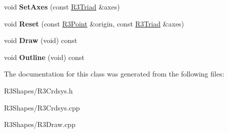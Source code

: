 \begin{DoxyCompactItemize}
\item 
void {\bfseries Set\+Axes} (const \hyperlink{class_r3_triad}{R3\+Triad} \&axes)\hypertarget{class_r3_coord_system_a3a53c0860ab32624dca0666797ef1923}{}\label{class_r3_coord_system_a3a53c0860ab32624dca0666797ef1923}

\item 
void {\bfseries Reset} (const \hyperlink{class_r3_point}{R3\+Point} \&origin, const \hyperlink{class_r3_triad}{R3\+Triad} \&axes)\hypertarget{class_r3_coord_system_a3173288920cf32f9712ecb7c4d6bbba7}{}\label{class_r3_coord_system_a3173288920cf32f9712ecb7c4d6bbba7}

\item 
void {\bfseries Draw} (void) const \hypertarget{class_r3_coord_system_a406ed7229477458b3403b56315c8de01}{}\label{class_r3_coord_system_a406ed7229477458b3403b56315c8de01}

\item 
void {\bfseries Outline} (void) const \hypertarget{class_r3_coord_system_a5fbef1883ae00e9156f2a32943007081}{}\label{class_r3_coord_system_a5fbef1883ae00e9156f2a32943007081}

\end{DoxyCompactItemize}


The documentation for this class was generated from the following files\+:\begin{DoxyCompactItemize}
\item 
R3\+Shapes/R3\+Crdsys.\+h\item 
R3\+Shapes/R3\+Crdsys.\+cpp\item 
R3\+Shapes/R3\+Draw.\+cpp\end{DoxyCompactItemize}

